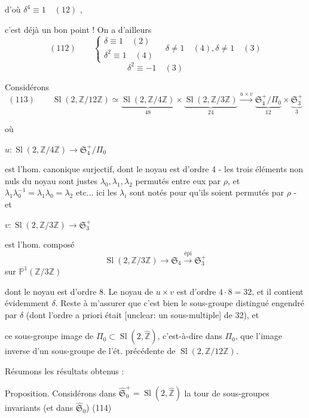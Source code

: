 d'où $\delta^4 \equiv 1 \quad (12)$ ,

c'est déjà un bon point ! On a d'ailleurs
$$ (112) \qquad \begin{cases} \delta \equiv 1 \quad (2) \\ \delta^2 \equiv 1 \quad (4) \end{cases} \quad \delta \neq 1 \quad (4), \delta \neq 1 \quad (3) $$
$$ \delta^2 \equiv -1 \quad (3) $$

Considérons
$$ (113) \qquad \operatorname{Sl}(2, \mathbb{Z}/12\mathbb{Z}) \simeq \underbrace{\operatorname{Sl}(2, \mathbb{Z}/4\mathbb{Z})}_{48} \times \underbrace{\operatorname{Sl}(2, \mathbb{Z}/3\mathbb{Z})}_{24} \xrightarrow{u \times v} \underbrace{\mathfrak{S}_4^+/\Pi_0}_{12} \times \underbrace{\mathfrak{S}_3^+}_{3} $$

où

$u : \operatorname{Sl}(2, \mathbb{Z}/4\mathbb{Z}) \longrightarrow \mathfrak{S}_4^+/\Pi_0$

est l'hom. canonique surjectif, dont le noyau
est d'ordre 4 - les trois éléments
non nuls du noyau sont justes
$\lambda_0, \lambda_1, \lambda_2$ permutés entre eux par $\rho$, et
$\lambda_1 \lambda_0^{-1} = \lambda_1 \lambda_0 = \lambda_2$ etc... ici les $\lambda_i$ sont
notés pour qu'ils soient permutés par $\rho$ - et

$v : \operatorname{Sl}(2, \mathbb{Z}/3\mathbb{Z}) \longrightarrow \mathfrak{S}_3^+$

est l'hom. composé
$$ \operatorname{Sl}(2, \mathbb{Z}/3\mathbb{Z}) \longrightarrow \mathfrak{S}_4 \xrightarrow{\text{épi}} \mathfrak{S}_3^+ $$
sur $\mathbb{P}^1(\mathbb{Z}/3\mathbb{Z})$

dont le noyau est d'ordre 8. Le noyau
de $u \times v$ est d'ordre $4 \cdot 8 = 32$, et il contient
évidemment $\delta$. Reste à m'assurer que c'est bien
le sous-groupe distingué engendré par $\delta$ (dont l'ordre
a priori était [unclear: un sous-multiple] de 32), et

\newpage


ce sous-groupe image de $\Pi_0 \subset \operatorname{Sl}(2,\hat{\mathbb{Z}})$, c'est-à-dire dans $\Pi_0$,
que l'image inverse d'un sous-groupe de
l'ét. précédente de $\operatorname{Sl}(2, \mathbb{Z}/12\mathbb{Z})$.

Résumons les résultats obtenus :

Proposition. Considérons dans $\hat{\mathfrak{S}}_0^+ = \operatorname{Sl}(2, \hat{\mathbb{Z}})$
la tour de sous-groupes invariants (et dans $\hat{\mathfrak{S}}_0$)
(114)

